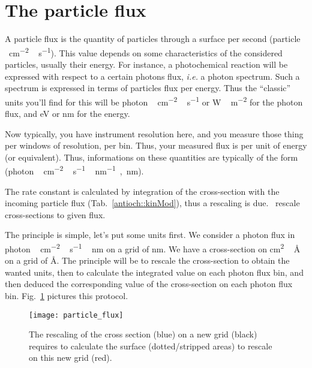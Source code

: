 \section{The particle flux}

A particle flux is the quantity of particles through
a surface per second (\unit{particle\,cm^{-2}\,s^{-1}}). This
value depends on some characteristics of the considered
particles, usually their energy. For instance, a photochemical
reaction will be expressed with respect to a certain photons
flux, \textit{i.e.} a photon spectrum. Such a spectrum is
expressed in terms of particles flux per energy. Thus the
``classic'' units you'll find for this will be
  \unit{photon\,cm^{-2}\,s^{-1}} or \unit{W\,m^{-2}} 
for the photon flux, and
  \unit{eV} or \unit{nm}
for the energy. 

Now typically, you have instrument resolution here, and you
measure those thing per windows of resolution, per bin. Thus,
your measured flux is per unit of energy (or equivalent). Thus,
informations on these quantities are typically of the form
(\unit{photon\,cm^{-2}\,s^{-1}\,nm^{-1}}~,~\unit{nm}).

The rate constant is calculated by integration of the
cross-section with the incoming particle flux 
(Tab.~\ref{antioch::kinMod}), thus a rescaling
is due. \Antioch\ rescale cross-sections to given
flux.

The principle is simple, let's put some units first. We
consider a photon flux in \unit{photon\,cm^{-2}\,s^{-1}\,nm}
on a grid of \unit{nm}. We have a cross-section on \unit{cm^2\,\AA}
on a grid of \unit{\AA}. The principle will be to rescale
the cross-section to obtain the wanted units, then to calculate
the integrated value on each photon flux bin, and then deduced
the corresponding value of the cross-section on each photon
flux bin. Fig.~\ref{dev:particle_flux_rescaling} pictures
this protocol.

\begin{figure}
\centering
\texttt{[image: particle\_flux]}
\caption{\label{dev:particle_flux_rescaling}The rescaling of the cross section (blue) on
a new grid (black) requires to calculate the surface (dotted/stripped areas) to rescale
on this new grid (red).}
\end{figure}
